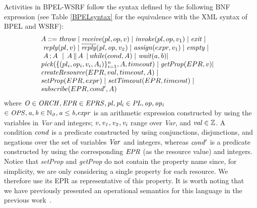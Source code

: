 Activities in BPEL-WSRF follow the syntax defined by the following
BNF expression (see Table \ref{BPELsyntax} for the
equivalence with the XML syntax of BPEL and WSRF):
\vspace{-0.2cm}  
\[\begin{array}{l}
  A ::=  {\it throw} \;|\;           %
         {\it receive}(pl,op,v) \;|\;  %
         {\it invoke}(pl,op,v_1) \;|\;
         {\it exit}\;|\;\\\
         {\it reply}(pl,v)\;|\;  %
         {\it \overline{reply}(pl,op,v_2)}\;|\; 
         {\it assign}(expr,v_1) \;|\;
         {\it empty}\;|\;\\
         \,\,A \,; A \,\, \;|\, %
         \;A \,\| \, A \;\,|\,   %
         {\it while}(cond,A)\;|\
         {\it wait}(a,b)\hspace{-0.1cm}\;|\;\\
         {\it pick}(\{(pl_i,op_i,v_i,A_i)\}_{i=1}^n,A,timeout)\;|\;
         {\it getProp}(EPR,v)\hspace{-0.1cm}\;|\;\\
         {\it createResource}(EPR,val,timeout,A)\;|\;\\
         {\it setProp}(EPR,expr)\;|\;
         {\it setTimeout}(EPR,timeout)\;|\;\\
         {\it subscribe}(EPR,cond',A)
\end{array}
\]
\vspace{-0.1cm}
\noindent \hspace{0.4cm}where ${\it O \in ORCH, EPR \in EPRS , pl,pl_{i} \in PL, op,op_{i}}$ ${\it \in OPS, a,b \in \mathbb{N}_{0},a\leq b,} \\ {\it  expr}$ is an arithmetic expression constructed by using the variables in {\it Var} and integers; ${\it v,v_1,v_2,v_i}$ range over {\it Var}, and ${\it val \in \mathbb{Z}}$. A condition ${\it cond}$ is a predicate constructed by using conjunctions, disjunctions, and negations over the set of variables ${\it Var}$ and integers, whereas ${\it cond'}$ is a predicate constructed by using the corresponding ${\it EPR}$ (as the resource value) and integers. Notice that \emph{setProp} and \emph{getProp} do not contain the property name since, for simplicity, 
we are only considering a single property for each resource.
We therefore use its EPR as representative of this property. It is worth noting that we have previously presented an operational semantics for this language in the previous
work~\cite{wsfm2011}.

